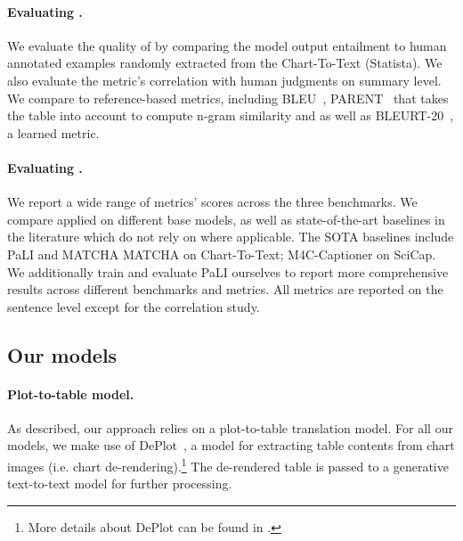 \paragraph{Evaluating \metric.} We evaluate the quality of \metric by comparing the model output entailment to human annotated examples randomly extracted from the Chart-To-Text (Statista). We also evaluate the metric's correlation with human judgments on summary level. We compare \metric to reference-based metrics, including BLEU~\cite{papineni-etal-2002-bleu}, PARENT~\cite{dhingra-etal-2019-handling} that takes the table into account to compute n-gram similarity and as well as BLEURT-20~\cite{sellam-etal-2020-bleurt, pu-etal-2021-learning}, a learned metric.

\paragraph{Evaluating \pipeline.} We report a wide range of metrics' scores across the three benchmarks. We compare \pipeline applied on different base models, as well as  state-of-the-art baselines in the literature which do not rely on \pipeline where applicable. 
The SOTA baselines include PaLI \citep{chen2023pali} and MATCHA \citep{liu-etal-2023-matcha} MATCHA on Chart-To-Text; M4C-Captioner \citep{horawalavithana2023scitune} on SciCap. We additionally train and evaluate PaLI \citep{chen2023pali} ourselves to report more comprehensive results across different benchmarks and metrics. 
All metrics are reported on the sentence level except for the correlation study.



\subsection{Our models}
\label{subsec:models}

\paragraph{Plot-to-table model.} As described, our approach relies on a plot-to-table translation model. For all our models, we make use of DePlot~\cite{liu-etal-2023-deplot}, a \sota model for extracting table contents from chart images (i.e. chart de-rendering).\footnote{More details about DePlot can be found in .} The de-rendered table is passed to a generative text-to-text model for further processing.

